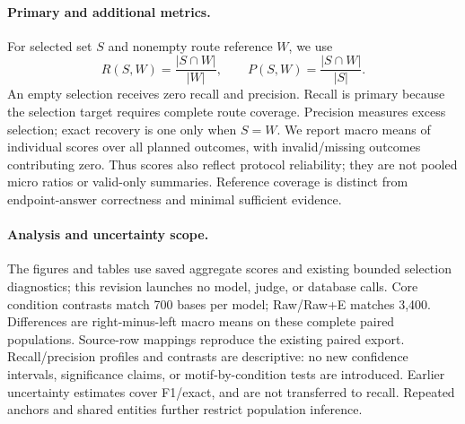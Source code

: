 \paragraph{Primary and additional metrics.}
For selected set $S$ and nonempty route reference $W$, we use
\begin{equation}
 R(S,W)=\frac{|S\cap W|}{|W|},\qquad
 P(S,W)=\frac{|S\cap W|}{|S|}.
\end{equation}
An empty selection receives zero recall and precision. Recall is primary because the selection target requires complete route coverage. Precision measures excess selection; exact recovery is one only when $S=W$. We report macro means of individual scores over all planned outcomes, with invalid/missing outcomes contributing zero. Thus scores also reflect protocol reliability; they are not pooled micro ratios or valid-only summaries. Reference coverage is distinct from endpoint-answer correctness and minimal sufficient evidence.

\paragraph{Analysis and uncertainty scope.}
The figures and tables use saved aggregate scores and existing bounded selection diagnostics; this revision launches no model, judge, or database calls. Core condition contrasts match 700 bases per model; Raw/Raw+E matches 3,400. Differences are right-minus-left macro means on these complete paired populations. Source-row mappings reproduce the existing paired export. Recall/precision profiles and contrasts are descriptive: no new confidence intervals, significance claims, or motif-by-condition tests are introduced. Earlier uncertainty estimates cover F1/exact, and are not transferred to recall. Repeated anchors and shared entities further restrict population inference.
